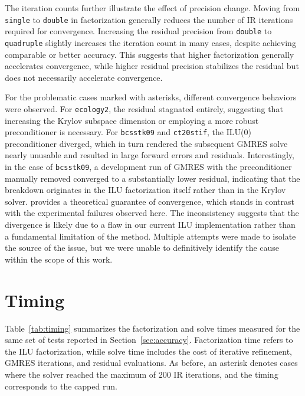 The iteration counts further illustrate the effect of precision change. Moving
from \texttt{single} to \texttt{double} in factorization generally reduces the
number of IR iterations required for convergence. Increasing the residual
precision from \texttt{double} to \texttt{quadruple} slightly increases the
iteration count in many cases, despite achieving comparable or better accuracy.
This suggests that higher factorization generally accelerates convergence, while
higher residual precision stabilizes the residual but does not necessarily
accelerate convergence.

For the problematic cases marked with asterisks, different convergence behaviors
were observed. For \texttt{ecology2}, the residual stagnated entirely,
suggesting that increasing the Krylov subspace dimension or employing a more
robust preconditioner is necessary. For \texttt{bcsstk09} and \texttt{ct20stif},
the ILU(0) preconditioner diverged, which in turn rendered the subsequent GMRES
solve nearly unusable and resulted in large forward errors and residuals.
Interestingly, in the case of \texttt{bcsstk09}, a development run of GMRES with
the preconditioner manually removed converged to a substantially lower residual,
indicating that the breakdown originates in the ILU factorization itself rather
than in the Krylov solver. \textcite{chow_fine-grained_2015} provides a
theoretical guarantee of convergence, which stands in contrast with the
experimental failures observed here. The inconsistency suggests that the
divergence is likely due to a flaw in our current ILU implementation rather than
a fundamental limitation of the method. Multiple attempts were made to isolate
the source of the issue, but we were unable to definitively identify the cause
within the scope of this work.

\section{Timing}
\label{sec:timing}

Table~\ref{tab:timing} summarizes the factorization and solve times measured for
the same set of tests reported in Section~\ref{sec:accuracy}. Factorization time
refers to the ILU factorization, while solve time includes the cost of iterative
refinement, GMRES iterations, and residual evaluations. As before, an asterisk
denotes cases where the solver reached the maximum of 200 IR iterations, and the
timing corresponds to the capped run.

